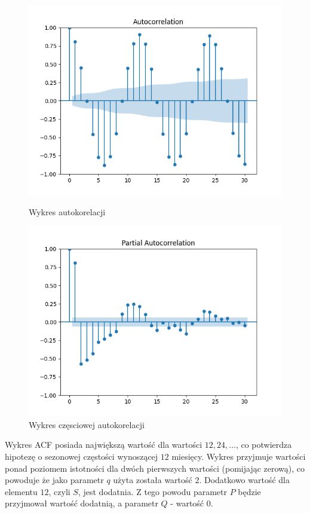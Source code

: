 \documentclass[12pt]{article}
\begin{document}
\begin{figure}[H]
    \begin{minipage}{.5\textwidth}
        \includegraphics[width=\textwidth]{img/acf.png}
        \caption{Wykres autokorelacji}
    \end{minipage}
    \begin{minipage}{.5\textwidth}
        \includegraphics[width=\textwidth]{img/pacf.png}
        \caption{Wykres częsciowej autokorelacji}
    \end{minipage}
\end{figure}

Wykres ACF posiada największą wartość dla wartości $12, 24, \dots$, co potwierdza hipotezę o sezonowej częstości wynoszącej $12$ miesięcy. Wykres przyjmuje wartości ponad poziomem istotności dla dwóch pierwszych wartości (pomijając zerową), co powoduje że jako parametr $q$ użyta została wartość $2$. Dodatkowo wartość dla elementu $12$, czyli $S$, jest dodatnia. Z tego powodu parametr $P$ będzie przyjmował wartość dodatnią, a parametr $Q$ - wartość $0$.
\end{document}
